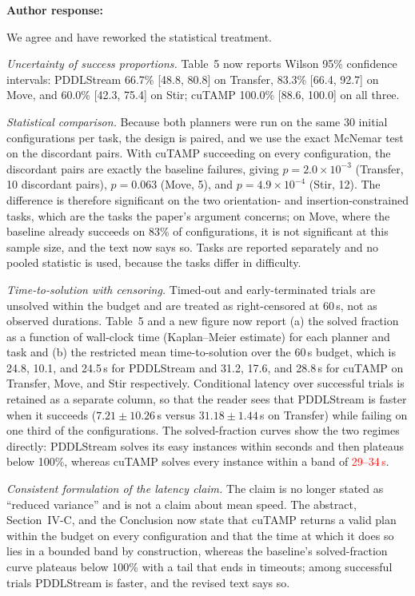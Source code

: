 \documentclass[11pt]{article}
\newcommand{\nd}[1]{\textcolor{red}{#1}}
\newenvironment{response}{\textbf{Author response:}\par\smallskip}{\par\medskip}
\begin{document}
\begin{response}
We agree and have reworked the statistical treatment.

\emph{Uncertainty of success proportions.}
Table~5 now reports Wilson 95\% confidence intervals: PDDLStream 66.7\% [48.8, 80.8] on Transfer, 83.3\% [66.4, 92.7] on Move, and 60.0\% [42.3, 75.4] on Stir; cuTAMP 100.0\% [88.6, 100.0] on all three.

\emph{Statistical comparison.}
Because both planners were run on the same 30 initial configurations per task, the design is paired, and we use the exact McNemar test on the discordant pairs.
With cuTAMP succeeding on every configuration, the discordant pairs are exactly the baseline failures, giving $p = 2.0\times10^{-3}$ (Transfer, 10 discordant pairs), $p = 0.063$ (Move, 5), and $p = 4.9\times10^{-4}$ (Stir, 12).
The difference is therefore significant on the two orientation- and insertion-constrained tasks, which are the tasks the paper's argument concerns; on Move, where the baseline already succeeds on 83\% of configurations, it is not significant at this sample size, and the text now says so.
Tasks are reported separately and no pooled statistic is used, because the tasks differ in difficulty.

\emph{Time-to-solution with censoring.}
Timed-out and early-terminated trials are unsolved within the budget and are treated as right-censored at 60\,s, not as observed durations.
Table~5 and a new figure now report (a) the solved fraction as a function of wall-clock time (Kaplan--Meier estimate) for each planner and task and (b) the restricted mean time-to-solution over the 60\,s budget, which is 24.8, 10.1, and 24.5\,s for PDDLStream and 31.2, 17.6, and 28.8\,s for cuTAMP on Transfer, Move, and Stir respectively.
Conditional latency over successful trials is retained as a separate column, so that the reader sees that PDDLStream is faster when it succeeds ($7.21 \pm 10.26$\,s versus $31.18 \pm 1.44$\,s on Transfer) while failing on one third of the configurations.
The solved-fraction curves show the two regimes directly: PDDLStream solves its easy instances within seconds and then plateaus below 100\%, whereas cuTAMP solves every instance within a band of \nd{29--34\,s}.

\emph{Consistent formulation of the latency claim.}
The claim is no longer stated as ``reduced variance'' and is not a claim about mean speed.
The abstract, Section~IV-C, and the Conclusion now state that cuTAMP returns a valid plan within the budget on every configuration and that the time at which it does so lies in a bounded band by construction, whereas the baseline's solved-fraction curve plateaus below 100\% with a tail that ends in timeouts; among successful trials PDDLStream is faster, and the revised text says so.
\end{response}
\end{document}
